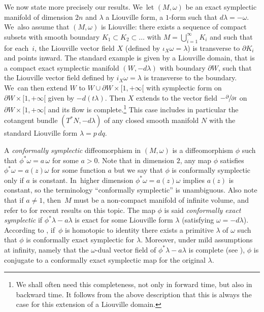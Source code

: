 \documentclass[10pt]{amsart}
\theoremstyle{definition}
\begin{document}
We now state more precisely our results. We~let $(M,\omega)$ be an exact symplectic manifold of dimension $2n$ and $\lambda$ a Liouville form, \ie a $1$-form such that $d\lambda=-\omega$. We~also assume that $(M,\omega)$ is Liouville:
there exists a sequence of compact subsets with smooth boundary $K_1\subset K_2\subset \dots $ with $M=\bigcup_{i=1}^\infty K_i$ and such that for each~$i$, the Liouville vector field $X$ (defined by $\iota_X\omega=\lambda$) is transverse to $\partial K_i$ and points inward.
The standard example is given by a Liouville domain, that is
a compact exact symplectic manifold $(W, -d\lambda)$ with boundary $\partial W$, such that the Liouville vector field defined by $i_X\omega=\lambda$ is transverse to the boundary. We~can then extend $W$ to $W\cup \partial W\times [1,+\infty[$ with symplectic form on $\partial W\times [1,+\infty[$ given by
$-d(t\lambda)$. Then $X$ extends to the vector field $- \sfrac{\partial}{\partial t}$ on $\partial W\times [1,+\infty[$ and its flow is complete.\footnote{We shall often need this completeness, not only in forward time, but also in backward time. It follows from the above description that this is always the case for this extension of a Liouville domain.} This case includes in particular the cotangent bundle $(T^*N, -d\lambda)$ of any closed smooth manifold $N$ with the standard Liouville form $\lambda=p\,dq$.

A \emph{conformally symplectic} diffeomorphism in $(M,\omega)$ is a diffeomorphism $\phi$ such that $\phi^*\omega=a\, \omega$ for some $a>0$. Note that in dimension $2$, any map $\phi$ satisfies $\phi^*\omega=a(z)\omega$ for some function $a$ but we say that $\phi$ is conformally symplectic only if $a$ is constant. In~higher dimension $\phi^*\omega=a(z)\omega$ implies $a(z)$ is constant, so the terminology ``conformally symplectic'' is unambiguous. Also note that if $a\neq 1$, then~$M$ must be a non-compact manifold of infinite volume, and refer to
\cite{Arnaud-Fejoz} for recent results on this topic. The map $\phi$ is said \emph{conformally exact symplectic} if $\phi^*{\lambda}-a \lambda$ is exact
for some Liouville form $\lambda$ (\ie satisfying $\omega=-d\lambda$).
According to \cite[App.\,B]{Arnaud-Fejoz}, if~$\phi$ is homotopic to identity there exists a primitive $\lambda$ of $\omega$ such that $\phi$ is conformally exact symplectic for $\lambda$. Moreover, under mild assumptions at infinity, namely that the $\omega$-dual vector field of $\phi^* \lambda-a \lambda$ is complete (see \cite[App.\,B, Prop.\,10]{Arnaud-Fejoz}), $\phi$ is conjugate to a conformally exact symplectic map for the original $\lambda$.
\end{document}
